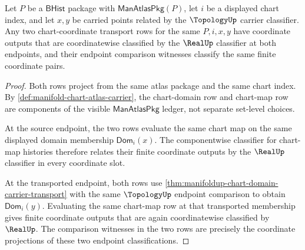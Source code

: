 \begin{theorem}
\label{thm:manifoldup-chart-coordinate-classifier-determinacy}
Let $P$ be a $\mathsf{BHist}$ package with $\mathsf{ManAtlasPkg}(P)$, let
$i$ be a displayed chart index, and let $x,y$ be carried points related by the
$\TopologyUp$ carrier classifier. Any two chart-coordinate transport rows for
the same $P,i,x,y$ have coordinate outputs that are coordinatewise classified
by the $\RealUp$ classifier at both endpoints, and their endpoint comparison
witnesses classify the same finite coordinate pairs.
\end{theorem}
\begin{proof}
Both rows project from the same atlas package and the same chart index. By
\autoref{def:manifold-chart-atlas-carrier}, the chart-domain row and chart-map
row are components of the visible $\mathsf{ManAtlasPkg}$ ledger, not separate
set-level choices.

At the source endpoint, the two rows evaluate the same chart map on the same
displayed domain membership $\mathsf{Dom}_i(x)$. The componentwise classifier
for chart-map histories therefore relates their finite coordinate outputs by
the $\RealUp$ classifier in every coordinate slot.

At the transported endpoint, both rows use
\autoref{thm:manifoldup-chart-domain-carrier-transport} with the same
$\TopologyUp$ endpoint comparison to obtain $\mathsf{Dom}_i(y)$. Evaluating the
same chart-map row at that transported membership gives finite coordinate
outputs that are again coordinatewise classified by $\RealUp$. The comparison
witnesses in the two rows are precisely the coordinate projections of these
two endpoint classifications.
\end{proof}

